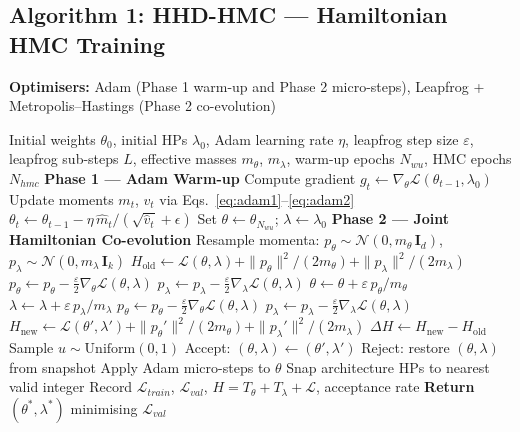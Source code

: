 \documentclass[11pt]{article}
\theoremstyle{definition}
\begin{document}
\subsection{Algorithm 1: HHD-HMC --- Hamiltonian HMC Training}
\begin{algorithm}[H]
\caption{HHD-HMC --- Hamiltonian HMC Training (HHD)}
\label{alg:hhd}
\textbf{Optimisers:} Adam (Phase 1 warm-up and Phase 2 micro-steps),
Leapfrog + Metropolis--Hastings (Phase 2 co-evolution)
\begin{algorithmic}[1]
\Require Initial weights $\theta_0$, initial HPs $\lambda_0$,
         Adam learning rate $\eta$,
         leapfrog step size $\varepsilon$,
         leapfrog sub-steps $L$,
         effective masses $m_\theta$, $m_\lambda$,
         warm-up epochs $N_{wu}$,
         HMC epochs $N_{hmc}$
\State \textbf{Phase 1 --- Adam Warm-up}
  \State Compute gradient $g_t \leftarrow \nabla_\theta\mathcal{L}(\theta_{t-1}, \lambda_0)$
  \State Update moments $m_t$, $v_t$ via Eqs.~\eqref{eq:adam1}--\eqref{eq:adam2}
  \State $\theta_t \leftarrow \theta_{t-1} - \eta\,\hat{m}_t / (\sqrt{\hat{v}_t} + \epsilon)$
\EndFor
\State Set $\theta \leftarrow \theta_{N_{wu}}$; $\lambda \leftarrow \lambda_0$
\State \textbf{Phase 2 --- Joint Hamiltonian Co-evolution}
  \State Resample momenta:
         $p_\theta \sim \mathcal{N}(0, m_\theta\,\mathbf{I}_d)$,
         $p_\lambda \sim \mathcal{N}(0, m_\lambda\,\mathbf{I}_k)$
  \State $H_{\mathrm{old}} \leftarrow \mathcal{L}(\theta,\lambda)
            + \|p_\theta\|^2/(2m_\theta)
            + \|p_\lambda\|^2/(2m_\lambda)$
    \State $p_\theta \leftarrow p_\theta
              - \tfrac{\varepsilon}{2}\nabla_\theta\mathcal{L}(\theta,\lambda)$
    \State $p_\lambda \leftarrow p_\lambda
              - \tfrac{\varepsilon}{2}\nabla_\lambda\mathcal{L}(\theta,\lambda)$
    \State $\theta \leftarrow \theta + \varepsilon\,p_\theta/m_\theta$
    \State $\lambda \leftarrow \lambda + \varepsilon\,p_\lambda/m_\lambda$
    \State $p_\theta \leftarrow p_\theta
              - \tfrac{\varepsilon}{2}\nabla_\theta\mathcal{L}(\theta,\lambda)$
    \State $p_\lambda \leftarrow p_\lambda
              - \tfrac{\varepsilon}{2}\nabla_\lambda\mathcal{L}(\theta,\lambda)$
  \EndFor
  \State $H_{\mathrm{new}} \leftarrow \mathcal{L}(\theta',\lambda')
            + \|p_\theta'\|^2/(2m_\theta)
            + \|p_\lambda'\|^2/(2m_\lambda)$
  \State $\Delta H \leftarrow H_{\mathrm{new}} - H_{\mathrm{old}}$
  \State Sample $u \sim \mathrm{Uniform}(0, 1)$
    \State Accept: $(\theta, \lambda) \leftarrow (\theta', \lambda')$
  \Else
    \State Reject: restore $(\theta, \lambda)$ from snapshot
  \EndIf
  \State Apply Adam micro-steps to $\theta$
  \State Snap architecture HPs to nearest valid integer
  \State Record $\mathcal{L}_{train}$, $\mathcal{L}_{val}$,
         $H = T_\theta + T_\lambda + \mathcal{L}$, acceptance rate
\EndFor
\State \textbf{Return} $(\theta^*, \lambda^*)$ minimising $\mathcal{L}_{val}$
\end{algorithmic}
\end{algorithm}
\end{document}
